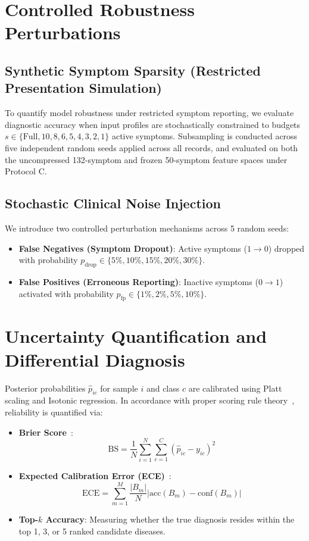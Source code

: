 \section{Controlled Robustness Perturbations}
\label{sec:robustness_perturbations}

\subsection{Synthetic Symptom Sparsity (Restricted Presentation Simulation)}
\label{subsec:sparsity_design}
To quantify model robustness under restricted symptom reporting, we evaluate diagnostic accuracy when input profiles are stochastically constrained to budgets $s \in \{\text{Full}, 10, 8, 6, 5, 4, 3, 2, 1\}$ active symptoms. Subsampling is conducted across five independent random seeds applied across all records, and evaluated on both the uncompressed 132-symptom and frozen 50-symptom feature spaces under Protocol C.

\subsection{Stochastic Clinical Noise Injection}
\label{subsec:noise_injection}
We introduce two controlled perturbation mechanisms across 5 random seeds:
\begin{itemize}
    \item \textbf{False Negatives (Symptom Dropout)}: Active symptoms ($1 \to 0$) dropped with probability $p_{\text{drop}} \in \{5\%, 10\%, 15\%, 20\%, 30\%\}$.
    \item \textbf{False Positives (Erroneous Reporting)}: Inactive symptoms ($0 \to 1$) activated with probability $p_{\text{fp}} \in \{1\%, 2\%, 5\%, 10\%\}$.
\end{itemize}

\section{Uncertainty Quantification and Differential Diagnosis}
\label{sec:uncertainty_quant}
Posterior probabilities $\hat{p}_{ic}$ for sample $i$ and class $c$ are calibrated using Platt scaling and Isotonic regression. In accordance with proper scoring rule theory~\cite{gneiting2007strictly}, reliability is quantified via:
\begin{itemize}
    \item \textbf{Brier Score}~\cite{brier1950verification}:
    \begin{equation}
        \text{BS} = \frac{1}{N} \sum_{i=1}^N \sum_{c=1}^C (\hat{p}_{ic} - y_{ic})^2
    \end{equation}
    \item \textbf{Expected Calibration Error (ECE)}~\cite{guo2017calibration}:
    \begin{equation}
        \text{ECE} = \sum_{m=1}^M \frac{|B_m|}{N} \left| \text{acc}(B_m) - \text{conf}(B_m) \right|
    \end{equation}
    \item \textbf{Top-$k$ Accuracy}: Measuring whether the true diagnosis resides within the top 1, 3, or 5 ranked candidate diseases.
\end{itemize}

